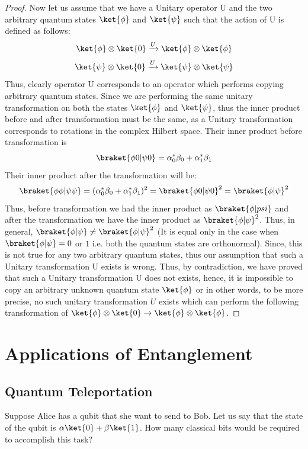 \documentclass[12pt, oneside]{book}
\theoremstyle{definition}
\theoremstyle{definition}
\theoremstyle{remark}
\begin{document}
\begin{proof}
    Now let us assume that we have a Unitary operator U and the two arbitrary quantum states $\ket{\phi}$ and $\ket{\psi}$ such that the action of U is defined as follows:
    \[
    \ket{\phi}\otimes \ket{0} \xrightarrow{U} \ket{\phi}\otimes \ket{\phi}
    \]
    \[
    \ket{\psi}\otimes \ket{0} \xrightarrow{U}\ket{\psi}\otimes \ket{\psi}
    \]
    Thus, clearly operator U corresponds to an operator which performs copying arbitrary quantum states.
    Since we are performing the same unitary transformation on both the states $\ket{\phi}$ and $\ket{\psi}$, thus the inner product before and after transformation must be the same, as a Unitary transformation corresponds to rotations in the complex Hilbert space. Their inner product before transformation is 
    \[
    \braket{\phi0|\psi0}=\alpha^*_0\beta_0+\alpha^*_1\beta_1
    \]
    Their inner product after the transformation will be:
    \[
    \braket{\phi\phi|\psi\psi}=(\alpha^*_0\beta_0+\alpha^*_1\beta_1)^2=\braket{\phi0|\psi0}^2=\braket{\phi|\psi}^2
    \]
    Thus, before transformation we had the inner product as $\braket{\phi|psi}$ and after the transformation we have the inner product as $\braket{\phi|\psi}^2$. Thus, in general, $\braket{\phi|\psi}\neq \braket{\phi|\psi}^2$ (It is equal only in the case when $\braket{\phi|\psi}=0$ or $1$ i.e. both the quantum states are orthonormal). Since, this is not true for any two arbitrary quantum states, thus our assumption that such a Unitary transformation U exists is wrong. Thus, by contradiction, we have proved that such a Unitary transformation U does not exists, hence, it is impossible to copy an arbitrary unknown quantum state $\ket{\phi}$ or in other words, to be more precise, no such unitary transformation $U$ exists which can perform the following transformation of $\ket{\phi} \otimes \ket{0} \rightarrow \ket{\phi} \otimes \ket{\phi}$.
\end{proof}

\section{Applications of Entanglement}
\subsection{Quantum Teleportation}
Suppose Alice has a qubit that she want to send to Bob. Let us say that the state of the qubit is $\alpha\ket{0}+\beta\ket{1}$. How many classical bits would be required to accomplish this task?
\end{document}
